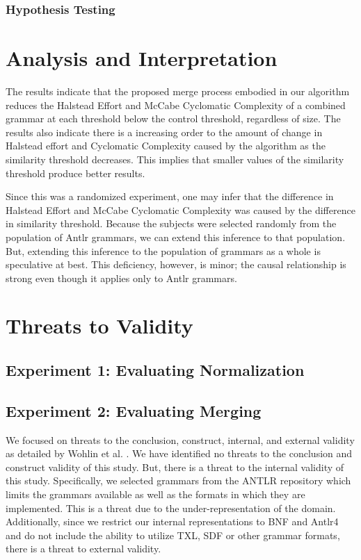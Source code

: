 \documentclass[10pt,nocc]{xrese_report}
\begin{document}
\subsection{Hypothesis Testing}

\chapter{Analysis and Interpretation}

The results indicate that the proposed merge process embodied in our algorithm reduces the Halstead Effort and McCabe Cyclomatic Complexity of a combined grammar at each threshold below the control threshold, regardless of size. The results also indicate  there is a increasing order to the amount of change in Halstead effort and Cyclomatic Complexity caused by the algorithm as the similarity threshold decreases. This implies that smaller values of the similarity threshold produce better results.

Since this was a randomized experiment, one may infer that the difference in Halstead Effort and McCabe Cyclomatic Complexity was caused by the difference in similarity threshold. Because the subjects were selected randomly from the population of Antlr grammars, we can extend this inference to that population. But, extending this inference to the population of grammars as a whole is speculative at best. This deficiency, however, is minor; the causal relationship is strong even though it applies only to Antlr grammars.


\chapter{Threats to Validity}

\section{Experiment 1: Evaluating Normalization}

\section{Experiment 2: Evaluating Merging}

We focused on threats to the conclusion, construct, internal, and external validity as detailed by Wohlin et al. \cite{wohlin_experimentation_2012}. We have identified no threats to the conclusion and construct validity of this study. But, there is a threat to the internal validity of this study. Specifically, we selected grammars from the ANTLR repository which limits the grammars available as well as the formats in which they are implemented. This is a threat due to the under-representation of the domain. Additionally, since we restrict our internal representations to BNF and Antlr4 and do not include the ability to utilize TXL, SDF or other grammar formats, there is a threat to external validity.
\end{document}

